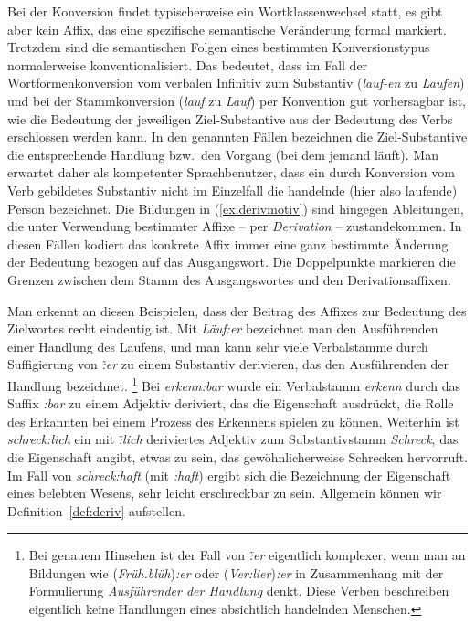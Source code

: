 
Bei der Konversion findet typischerweise ein Wortklassenwechsel statt, es gibt aber kein Affix, das eine spezifische semantische Veränderung formal markiert.
Trotzdem sind die semantischen Folgen eines bestimmten Konversionstypus normalerweise konventionalisiert. 
Das bedeutet, dass \zB im Fall der Wortformenkonversion vom verbalen Infinitiv zum Substantiv (\textit{lauf-en} zu \textit{Laufen}) und bei der Stammkonversion (\textit{lauf} zu \textit{Lauf}) per Konvention gut vorhersagbar ist, wie die Bedeutung der jeweiligen Ziel-Substantive aus der Bedeutung des Verbs erschlossen werden kann.
In den genannten Fällen bezeichnen die Ziel-Substantive die entsprechende Handlung bzw.\ den Vorgang (bei dem \zB jemand läuft).
Man erwartet daher als kompetenter Sprachbenutzer, dass ein durch Konversion vom Verb gebildetes Substantiv \zB nicht im Einzelfall die handelnde (hier also laufende) Person bezeichnet.
Die Bildungen in (\ref{ex:derivmotiv}) sind hingegen Ableitungen, die unter Verwendung bestimmter Affixe -- per \textit{Derivation} -- zustandekommen.
In diesen Fällen kodiert das konkrete Affix immer eine ganz bestimmte Änderung der Bedeutung bezogen auf das Ausgangswort.
Die Doppelpunkte markieren die Grenzen zwischen dem Stamm des Ausgangswortes und den Derivationsaffixen.

\begin{exe}
  \ex\label{ex:derivmotiv}
  \begin{xlist}
  \end{xlist}
\end{exe}

Man erkennt an diesen Beispielen, dass der Beitrag des Affixes zur Bedeutung des Zielwortes recht eindeutig ist.
Mit \textit{Läuf:er} bezeichnet man den Ausführenden einer Handlung des Laufens, und man kann sehr viele Verbalstämme durch Suffigierung von \textit{\~:er} zu einem Substantiv derivieren, das den Ausführenden der Handlung bezeichnet.%
\footnote{Bei genauem Hinsehen ist der Fall von \textit{\~:er} eigentlich komplexer, wenn man an Bildungen wie (\textit{Früh.blüh})\textit{:er} oder (\textit{Ver:lier})\textit{:er} in Zusammenhang mit der Formulierung \textit{Ausführender der Handlung} denkt.
Diese Verben beschreiben eigentlich keine Handlungen eines absichtlich handelnden Menschen.}
Bei \textit{erkenn:bar} wurde ein Verbalstamm \textit{erkenn} durch das Suffix \textit{:bar} zu einem Adjektiv deriviert, das die Eigenschaft ausdrückt, die Rolle des Erkannten bei einem Prozess des Erkennens spielen zu können.
Weiterhin ist \textit{schreck:lich} ein mit \textit{\~:lich} deriviertes Adjektiv zum Substantivstamm \textit{Schreck}, das die Eigenschaft angibt, etwas zu sein, das gewöhnlicherweise Schrecken hervorruft.
Im Fall von \textit{schreck:haft} (mit \textit{:haft}) ergibt sich die Bezeichnung der Eigenschaft eines belebten Wesens, sehr leicht erschreckbar zu sein.
Allgemein können wir Definition~\ref{def:deriv} aufstellen.

